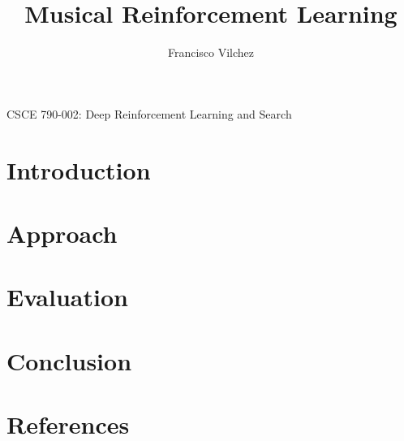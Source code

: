 \documentclass[]{article}
\title{Musical Reinforcement Learning}
\author{Francisco Vilchez}
\makeatletter
\renewcommand\maketitle {
  \begin{center}
    {\Large{\course}}
    \medskip\par\noindent
    {\Large\textbf{\@title}}
    \medskip\par\noindent
    {\Large\@author}
    \medskip\par\noindent
    {\Large\@date}
    \bigskip\par\noindent
  \end{center}
}
\newcommand{\course}{CSCE 790-002: Deep Reinforcement Learning and Search}
\makeatother
\begin{document}
\maketitle

\section*{Introduction}


\section*{Approach}


\section*{Evaluation}


\section*{Conclusion}


\section*{References}


\end{document}

